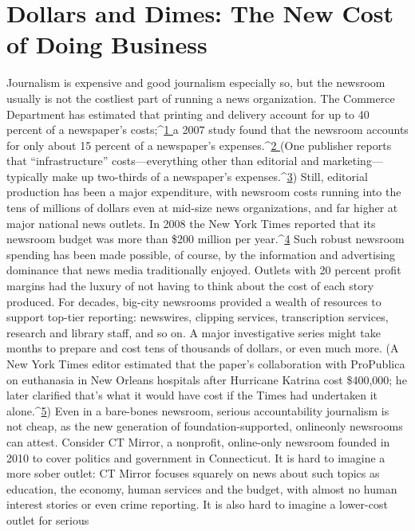 \chapter{Dollars and Dimes: The New Cost of Doing Business}
Journalism is expensive and good journalism especially so, but the newsroom
usually is not the costliest part of running a news organization. The Commerce
Department has estimated that printing and delivery account for up to 40 percent
of a newspaper’s costs;^{\href{#endnotes-ch7}{1 }}a 2007 study found that the newsroom accounts for
only about 15 percent of a newspaper’s expenses.^{\href{#endnotes-ch7}{2 }}(One publisher reports that
``infrastructure'' costs—everything other than editorial and marketing—typically
make up two-thirds of a newspaper’s expenses.^{\href{#endnotes-ch7}{3}}) Still, editorial production has
been a major expenditure, with newsroom costs running into the tens of millions
of dollars even at mid-size news organizations, and far higher at major national
news outlets. In 2008 the New York Times reported that its newsroom budget
was more than \$200 million per year.^{\href{#endnotes-ch7}{4}}
Such robust newsroom spending has been made possible, of course, by the
information and advertising dominance that news media traditionally enjoyed.
Outlets with 20 percent profit margins had the luxury of not having to think
about the cost of each story produced. For decades, big-city newsrooms provided
a wealth of resources to support top-tier reporting: newswires, clipping services,
transcription services, research and library staff, and so on. A major investigative
series might take months to prepare and cost tens of thousands of dollars, or even
much more. (A New York Times editor estimated that the paper’s collaboration
with ProPublica on euthanasia in New Orleans hospitals after Hurricane Katrina
cost \$400,000; he later clarified that’s what it would have cost if the Times had
undertaken it alone.^{\href{#endnotes-ch7}{5}}) Even in a bare-bones newsroom, serious accountability
journalism is not cheap, as the new generation of foundation-supported, onlineonly
newsrooms can attest.
Consider CT Mirror, a nonprofit, online-only newsroom founded in 2010 to
cover politics and government in Connecticut. It is hard to imagine a more sober
outlet: CT Mirror focuses squarely on news about such topics as education, the
economy, human services and the budget, with almost no human interest stories
or even crime reporting. It is also hard to imagine a lower-cost outlet for serious

